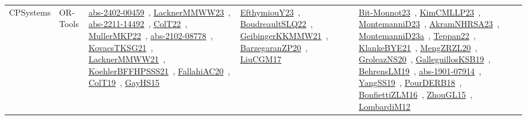 {\begin{longtable}{lp{3cm}>{\raggedright\arraybackslash}p{6cm}>{\raggedright\arraybackslash}p{6cm}>{\raggedright\arraybackslash}p{8cm}}
CPSystems & OR-Tools & \href{works/abs-2402-00459.pdf}{abs-2402-00459}~\cite{abs-2402-00459}, \href{works/LacknerMMWW23.pdf}{LacknerMMWW23}~\cite{LacknerMMWW23}, \href{works/abs-2211-14492.pdf}{abs-2211-14492}~\cite{abs-2211-14492}, \href{works/ColT22.pdf}{ColT22}~\cite{ColT22}, \href{works/MullerMKP22.pdf}{MullerMKP22}~\cite{MullerMKP22}, \href{works/abs-2102-08778.pdf}{abs-2102-08778}~\cite{abs-2102-08778}, \href{works/KovacsTKSG21.pdf}{KovacsTKSG21}~\cite{KovacsTKSG21}, \href{works/LacknerMMWW21.pdf}{LacknerMMWW21}~\cite{LacknerMMWW21}, \href{works/KoehlerBFFHPSSS21.pdf}{KoehlerBFFHPSSS21}~\cite{KoehlerBFFHPSSS21}, \href{works/FallahiAC20.pdf}{FallahiAC20}~\cite{FallahiAC20}, \href{works/ColT19.pdf}{ColT19}~\cite{ColT19}, \href{works/GayHS15.pdf}{GayHS15}~\cite{GayHS15} & \href{works/EfthymiouY23.pdf}{EfthymiouY23}~\cite{EfthymiouY23}, \href{works/BoudreaultSLQ22.pdf}{BoudreaultSLQ22}~\cite{BoudreaultSLQ22}, \href{works/GeibingerKKMMW21.pdf}{GeibingerKKMMW21}~\cite{GeibingerKKMMW21}, \href{works/BarzegaranZP20.pdf}{BarzegaranZP20}~\cite{BarzegaranZP20}, \href{works/LiuCGM17.pdf}{LiuCGM17}~\cite{LiuCGM17} & \href{works/Bit-Monnot23.pdf}{Bit-Monnot23}~\cite{Bit-Monnot23}, \href{works/KimCMLLP23.pdf}{KimCMLLP23}~\cite{KimCMLLP23}, \href{works/MontemanniD23.pdf}{MontemanniD23}~\cite{MontemanniD23}, \href{works/AkramNHRSA23.pdf}{AkramNHRSA23}~\cite{AkramNHRSA23}, \href{works/MontemanniD23a.pdf}{MontemanniD23a}~\cite{MontemanniD23a}, \href{works/Teppan22.pdf}{Teppan22}~\cite{Teppan22}, \href{works/KlankeBYE21.pdf}{KlankeBYE21}~\cite{KlankeBYE21}, \href{works/MengZRZL20.pdf}{MengZRZL20}~\cite{MengZRZL20}, \href{works/GroleazNS20.pdf}{GroleazNS20}~\cite{GroleazNS20}, \href{works/GalleguillosKSB19.pdf}{GalleguillosKSB19}~\cite{GalleguillosKSB19}, \href{works/BehrensLM19.pdf}{BehrensLM19}~\cite{BehrensLM19}, \href{works/abs-1901-07914.pdf}{abs-1901-07914}~\cite{abs-1901-07914}, \href{works/YangSS19.pdf}{YangSS19}~\cite{YangSS19}, \href{works/PourDERB18.pdf}{PourDERB18}~\cite{PourDERB18}, \href{works/BonfiettiZLM16.pdf}{BonfiettiZLM16}~\cite{BonfiettiZLM16}, \href{works/ZhouGL15.pdf}{ZhouGL15}~\cite{ZhouGL15}, \href{works/LombardiM12.pdf}{LombardiM12}~\cite{LombardiM12}\\

\end{longtable}}
